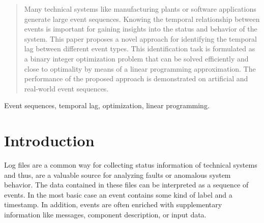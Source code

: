 \documentclass[journal, 10pt]{IEEEtran}
\begin{document}


\maketitle

\begin{abstract}
Many technical systems like manufacturing plants or software applications generate large event sequences. Knowing the temporal relationship between events is important for gaining insights into the status and behavior of the system. This paper proposes a novel approach for identifying the temporal lag between different event types. This identification task is formulated as a binary integer optimization problem that can be solved efficiently and close to optimality by means of a linear programming approximation. The performance of the proposed approach is demonstrated on artificial and real-world event sequences.
\end{abstract}

\begin{IEEEkeywords}
Event sequences, temporal lag, optimization, linear programming.
\end{IEEEkeywords}


%
\IEEEpeerreviewmaketitle



\section{Introduction}
\label{sec:introduction}
Log files are a common way for collecting status information of technical systems and thus, are a valuable source for analyzing faults or anomalous system behavior. The data contained in these files can be  interpreted as a sequence of events. In the most basic case an event contains some kind of label and a timestamp. In addition, events are often enriched with supplementary information like messages, component description, or input data. 
\end{document}
